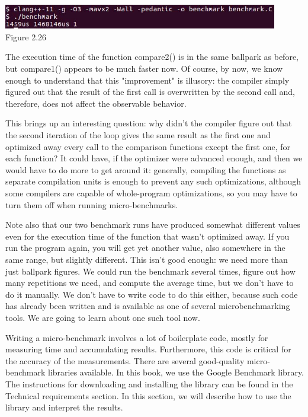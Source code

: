\hspace*{\fill} \\ %
\begin{center}
\includegraphics[width=0.9\textwidth]{content/1/chapter2/images/26.jpg}\\
Figure 2.26
\end{center}

The execution time of the function compare2() is in the same ballpark as before, but compare1() appears to be much faster now. Of course, by now, we know enough to understand that this "improvement" is illusory: the compiler simply figured out that the result of the first call is overwritten by the second call and, therefore, does not affect the observable behavior.

This brings up an interesting question: why didn't the compiler figure out that the second iteration of the loop gives the same result as the first one and optimized away every call to the comparison functions except the first one, for each function? It could have, if the optimizer were advanced enough, and then we would have to do more to get around it: generally, compiling the functions as separate compilation units is enough to prevent any such optimizations, although some compilers are capable of whole-program optimizations, so you may have to turn them off when running micro-benchmarks.

Note also that our two benchmark runs have produced somewhat different values even for the execution time of the function that wasn't optimized away. If you run the program again, you will get yet another value, also somewhere in the same range, but slightly different. This isn't good enough: we need more than just ballpark figures. We could run the benchmark several times, figure out how many repetitions we need, and compute the average time, but we don't have to do it manually. We don't have to write code to do this either, because such code has already been written and is available as one of several microbenchmarking tools. We are going to learn about one such tool now.


Writing a micro-benchmark involves a lot of boilerplate code, mostly for measuring time and accumulating results. Furthermore, this code is critical for the accuracy of the measurements. There are several good-quality micro-benchmark libraries available. In this book, we use the Google Benchmark library. The instructions for downloading and installing the library can be found in the Technical requirements section. In this section, we will describe how to use the library and interpret the results.


